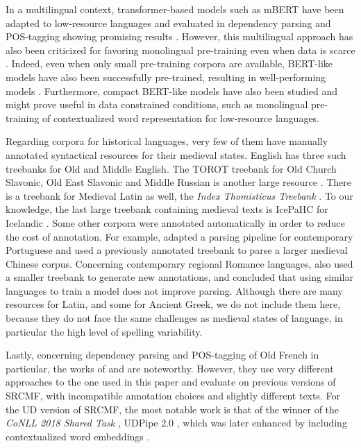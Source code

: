 In a multilingual context, transformer-based models such as mBERT have been adapted to low-resource languages and evaluated in dependency parsing and POS-tagging showing promising results \citep{chau-etal-2020-parsing, muller-etal-2021-unseen, gururangan-etal-2020-dont, wang-etal-2020-extending}. However, this multilingual approach has also been criticized for favoring monolingual pre-training even when data is scarce \citep{virtanen-etal-2019-multilingual, ortiz-suarez-etal-2020-monolingual}. Indeed, even when only small pre-training corpora are available, BERT-like models have also been successfully pre-trained, resulting in well-performing models \citep{micheli-etal-2020-importance}. Furthermore, compact BERT-like models have also been studied \citep{turc-etal-2019-well} and might prove useful in data constrained conditions, such as monolingual pre-training of contextualized word representation for low-resource languages.

Regarding corpora for historical languages, very few of them have manually annotated syntactical resources for their medieval states. English has three such treebanks \citep{oxford-2001-the,kroch-etal-2000-the,traugott-pintzuk-2008-coding} for Old and Middle English. The TOROT treebank for Old Church Slavonic, Old East Slavonic and Middle Russian is another large resource \citep{berdicevskis-eckhoff-2020-diachronic}. There is a treebank for Medieval Latin as well, the \emph{Index Thomisticus Treebank} \citep{passarotti-2019-project}. To our knowledge, the last large treebank containing medieval texts is IcePaHC for Icelandic \citep{rognvaldsson-etal-2012-icelandic}. Some other corpora were annotated automatically in order to reduce the cost of annotation. For example, \citet{rocio-etal-2003-automated} adapted a parsing pipeline for contemporary Portuguese and \citet{lee-kong-2014-a} used a previously annotated treebank \citep{lee-kong-2012-dependency} to parse a larger medieval Chinese corpus. Concerning contemporary regional Romance languages, \citet{miletic-etal-2020-building} also used a smaller treebank to generate new annotations, and concluded that using similar languages to train a model does not improve parsing. Although there are many resources for Latin, and some for Ancient Greek, we do not include them here, because they do not face the same challenges as medieval states of language, in particular the high level of spelling variability.

Lastly, concerning dependency parsing and POS-tagging of Old French in particular, the works of \citet{guibon-etal-2014-parsing} and \citet{stein-2014-parsing, stein-2016-old} are noteworthy. However, they use very different approaches to the one used in this paper and evaluate on previous versions of SRCMF, with incompatible annotation choices and slightly different texts. For the UD version of SRCMF, the most notable work is that of the winner of the \emph{CoNLL 2018 Shared Task} \citep{zeman-etal-2018-conll}, UDPipe 2.0 \citep{straka-2018-udpipe}, which was later enhanced by including contextualized word embeddings \citep{straka-strakova-2019-evaluating}.


